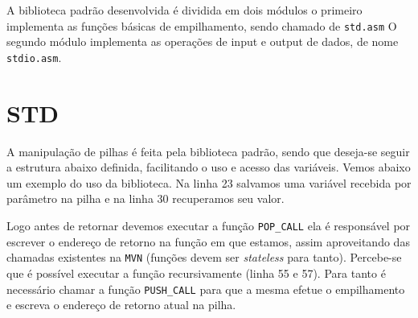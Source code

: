
A biblioteca padrão desenvolvida é dividida em dois módulos o primeiro
implementa as funções básicas de empilhamento, sendo chamado de \verb!std.asm!
O segundo módulo implementa as operações de input e output de dados, de nome 
\verb!stdio.asm!.

\section{STD}

A manipulação de pilhas é feita pela biblioteca padrão, sendo que deseja-se
seguir a estrutura abaixo definida, facilitando o uso e acesso das variáveis.
Vemos abaixo um exemplo do uso da biblioteca. Na linha 23 salvamos uma variável
recebida por parâmetro na pilha e na linha 30 recuperamos seu valor. 

Logo antes de retornar devemos executar a função \verb!POP_CALL! 
ela é responsável por
escrever o endereço de retorno na função em que estamos, assim aproveitando das
chamadas existentes na \verb!MVN! (funções devem ser \emph{stateless} para tanto). Percebe-se
que é possível executar a função recursivamente (linha 55 e 57). Para tanto é
necessário chamar a função \verb!PUSH_CALL! para que a mesma efetue o
empilhamento e escreva o endereço de retorno atual na pilha. 

